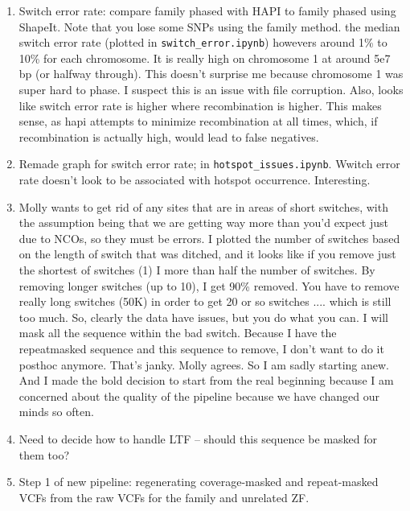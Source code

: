 \documentclass[idxtotoc,hyperref,openany,oneside]{labbook} %
\begin{document}
\begin{enumerate}
\item Switch error rate: compare family phased with HAPI to family phased using ShapeIt. Note that you lose some SNPs using the family method. the median switch error rate (plotted in \verb+switch_error.ipynb+) howevers around 1\% to 10\% for each chromosome. It is really high on chromosome 1 at around 5e7 bp (or halfway through). This doesn't surprise me because chromosome 1 was super hard to phase. I suspect this is an issue with file corruption. Also, looks like switch error rate is higher where recombination is higher. This makes sense, as hapi attempts to minimize recombination at all times, which, if recombination is actually high, would lead to false negatives.
\item Remade graph for switch error rate; in \verb+hotspot_issues.ipynb+. Wwitch error rate doesn't look to be associated with hotspot occurrence. Interesting.
\item Molly wants to get rid of any sites that are in areas of short switches, with the assumption being that we are getting way more than you'd expect just due to NCOs, so they must be errors. I plotted the number of switches based on the length of switch that was ditched, and it looks like if you remove just the shortest of switches (1) I more than half the number of switches. By removing longer switches (up to 10), I get 90\% removed. You have to remove really long switches (50K) in order to get 20 or so switches .... which is still too much. So, clearly the data have issues, but you do what you can. I will mask all the sequence within the bad switch. Because I have the repeatmasked sequence and this sequence to remove, I don't want to do it posthoc anymore. That's janky. Molly agrees. So I am sadly starting anew. And I made the bold decision to start from the real beginning because I am concerned about the quality of the pipeline because we have changed our minds so often.
\item Need to decide how to handle LTF -- should this sequence be masked for them too?
\item Step 1 of new pipeline: regenerating coverage-masked and repeat-masked VCFs from the raw VCFs for the family and unrelated ZF.
\end{enumerate}
\end{document}
